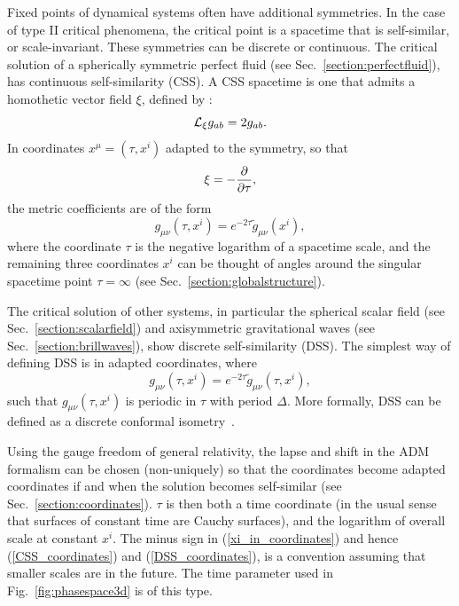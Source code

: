 \documentclass{article}
\begin{document}
Fixed points of dynamical systems often have additional symmetries. In
the case of type II critical phenomena, the critical point is a
spacetime that is self-similar, or scale-invariant. 
These symmetries can be discrete or continuous. The critical
solution of a spherically symmetric perfect fluid (see
Sec.~\ref{section:perfectfluid}), has continuous self-similarity
(CSS). A CSS spacetime is one that admits a homothetic vector field
$\xi$, defined by \cite{CahillTaub}:
%
\begin{equation}
  \label{homothetic_metric}
  {\cal L}_\xi g_{ab} = 2 g_{ab}.
\end{equation}
%
In coordinates $x^\mu=(\tau, x^i)$ adapted to the symmetry, so that
%
\begin{equation}
  \label{xi_in_coordinates}
  \xi = - {\partial\over\partial\tau},
\end{equation}
% 
the metric coefficients are of the form
%
\begin{equation}
  \label{CSS_coordinates}
  g_{\mu\nu}(\tau, x^i) = e^{-2\tau} \tilde g_{\mu\nu}(x^i),
\end{equation}
%
where the coordinate $\tau$ is the negative logarithm of a
spacetime scale, and the remaining three coordinates $x^i$ can be
thought of angles around the singular spacetime point $\tau=\infty$
(see Sec.~\ref{section:globalstructure}).

The critical solution of other systems, in particular the spherical
scalar field (see Sec.~\ref{section:scalarfield}) and axisymmetric
gravitational waves (see Sec.~\ref{section:brillwaves}), show 
discrete self-similarity (DSS). The simplest way of defining
DSS is in adapted coordinates, where
%
\begin{equation}
  \label{DSS_coordinates}
  g_{\mu\nu}(\tau, x^i) = e^{-2\tau} \tilde g_{\mu\nu}(\tau,x^i),
\end{equation}
%
such that $g_{\mu\nu}(\tau,x^i)$ is periodic in $\tau$ with period
$\Delta$. More formally, DSS can be defined as a discrete conformal
isometry~\cite{Gundlach_Chop1}.

Using the gauge freedom of general relativity, the lapse and shift in
the ADM formalism can be chosen (non-uniquely) so that the coordinates
become adapted coordinates if and when the solution becomes
self-similar (see
Sec.~\ref{section:coordinates}). $\tau$ is then both a time coordinate
(in the usual sense that surfaces of constant time are Cauchy
surfaces), and the logarithm of overall scale at constant $x^i$. The
minus sign in (\ref{xi_in_coordinates}) and hence
(\ref{CSS_coordinates}) and (\ref{DSS_coordinates}), is a convention
assuming that smaller scales are in the future. The time parameter
used in Fig.~\ref{fig:phasespace3d} is of this
type. 
\end{document}
